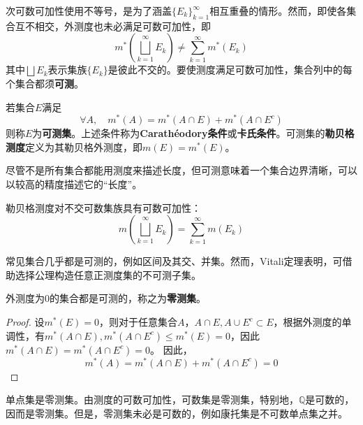 次可数可加性使用不等号，是为了涵盖$\{E_k\}_{k=1}^{\infty}$相互重叠的情形。然而，即使各集合互不相交，外测度也未必满足可数可加性，即
$$m^*\left(\bigsqcup_{k=1}^{\infty}E_k\right)\neq\sum_{k=1}^{\infty}m^*(E_k)$$
其中$\bigsqcup E_k$表示集族$\{E_k\}$是彼此不交的。要使测度满足可数可加性，集合列中的每个集合都须\textbf{可测}。

\begin{definition}[可测集]
    若集合$E$满足
    $$\forall A,\quad m^*(A)=m^*(A\cap E)+m^*(A\cap E^c)$$
    则称$E$为\textbf{可测集}。上述条件称为\textbf{Carathéodory条件}或\textbf{卡氏条件}。可测集的\textbf{勒贝格测度}定义为其勒贝格外测度，即$m(E)=m^*(E)$。
\end{definition}
尽管不是所有集合都能用测度来描述长度，但可测意味着一个集合边界清晰，可以以较高的精度描述它的“长度”。

勒贝格测度对不交可数集族具有可数可加性：
\[m\left(\bigsqcup_{k=1}^{\infty}E_k\right)=\sum_{k=1}^{\infty}m(E_k)\]

常见集合几乎都是可测的，例如区间及其交、并集。然而，Vitali定理\cite{real_analysis}表明，可借助选择公理构造任意正测度集的不可测子集。


\begin{proposition}
    外测度为0的集合都是可测的，称之为\textbf{零测集}。
\end{proposition}
\begin{proof}
    设$m^*(E)=0$，则对于任意集合$A$，$A\cap E,A\cup E^c\subset E$，根据外测度的单调性，有$m^*(A\cap E),m^*(A\cap E^c)\leq m^*(E)=0$，因此$m^*(A\cap E)=m^*(A\cap E^c)=0$。
    因此，
    \[m^*(A)=m^*(A\cap E)+m^*(A\cap E^c)=0\]
\end{proof}

\begin{example}
    单点集是零测集。由测度的可数可加性，可数集是零测集，特别地，$\mathbb{Q}$是可数的，因而是零测集。但是，零测集未必是可数的，例如康托集是不可数单点集之并\cite{real_analysis}。
\end{example}


